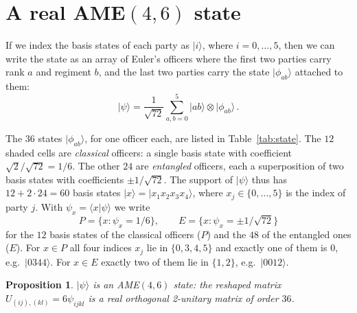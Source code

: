 \documentclass[aps,pra,reprint,superscriptaddress,amsmath,amssymb,longbibliography]{revtex4-2}
\newcommand{\ket}[1]{\lvert #1\rangle}
\newcommand{\braket}[2]{\langle #1\vert #2\rangle}
\theoremstyle{plain}
\newtheorem{proposition}{Proposition}
\begin{document}
\section{A real \texorpdfstring{AME$(4,6)$}{AME(4,6)} state}\label{sec:state}

If we index the basis states of each party as $\ket{i}$, where $i = 0,\dots,5$, then we can write the state as an array of Euler's officers where the first two
parties carry rank $a$ and regiment $b$, and the last two parties carry the state $\ket{\phi_{ab}}$ attached to them:
\begin{equation}\label{eq:state}
\ket\psi=\frac{1}{\sqrt{72}}\sum_{a,b=0}^{5}\ket{ab}\otimes\ket{\phi_{ab}}\,.
\end{equation}

\begin{table}[t]
\caption{The real AME$(4,6)$ state of Eq.~\eqref{eq:state} as Euler's array of officers: row $a$ (rank), column $b$
(regiment), entry $\ket{\phi_{ab}}$, the unnormalized state of the third and fourth party.  Shaded: the $12$ classical
officers $\sqrt2\,\ket{cd}$.  All other entries are two-term states $\pm\ket{cd}\pm\ket{c'd'}$.}
\label{tab:state}

\end{table}
The $36$ states $\ket{\phi_{ab}}$, for one officer each, are listed in Table~\ref{tab:state}.
The $12$ shaded cells are \emph{classical} officers: a single
basis state with coefficient $\sqrt2/\sqrt{72}=1/6$.  The other $24$ are \emph{entangled} officers, each a
superposition of two basis states with coefficients $\pm1/\sqrt{72}$.  The support of $\ket\psi$ thus has
$12+2\cdot24=60$ basis states $\ket x=\ket{x_1x_2x_3x_4}$, where $x_j\in\{0,\dots,5\}$ is the index of party $j$.
With $\psi_x=\braket{x}{\psi}$ we write
\[
P=\{x:\psi_x=1/6\},\qquad E=\{x:\psi_x=\pm1/\sqrt{72}\}
\]
for the $12$ basis states of the classical officers ($P$) and the $48$ of the entangled ones ($E$).
For $x\in P$ all four indices $x_j$ lie in $\{0,3,4,5\}$ and exactly one of them is $0$, e.g.\ $\ket{0344}$.
For $x\in E$ exactly two of them lie in $\{1,2\}$, e.g.\ $\ket{0012}$.

\begin{proposition}\label{prop:state}
$\ket\psi$ is an AME$(4,6)$ state: the reshaped matrix $U_{(ij),(kl)}=6\psi_{ijkl}$ is a real orthogonal 2-unitary matrix of order $36$.
\end{proposition}
\end{document}
